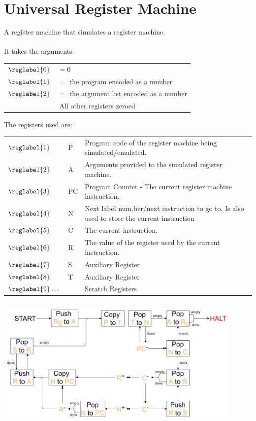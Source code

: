 \section{Universal Register Machine}
A register machine that simulates a register machine.
\\
\\ It takes the arguments:
\begin{center}
	\begin{tabular}{l p{}}
		$\reglabel{0}$ & $= 0$                                      \\
		$\reglabel{1}$ & $= $ the program encoded as a number       \\
		$\reglabel{2}$ & $= $ the argument list encoded as a number \\
		\multicolumn{2}{c}{All other registers zeroed}              \\
	\end{tabular}
\end{center}
The registers used are:
\begin{center}
	\begin{tabular}{l l p{}}
		$\reglabel{1}$      & P  & Program code of the register machine being simulated/emulated.                              \\
		$\reglabel{2}$      & A  & Arguments provided to the simulated register machine.                                       \\
		$\reglabel{3}$      & PC & Program Counter - The current register machine instruction.                                 \\
		$\reglabel{4}$      & N  & Next label num,ber/next instruction to go to. Is also used to store the current instruction \\
		$\reglabel{5}$      & C  & The current instruction.                                                                    \\
		$\reglabel{6}$      & R  & The value of the register used by the current instruction.                                  \\
		$\reglabel{7}$      & S  & Auxiliary Register                                                                          \\
		$\reglabel{8}$      & T  & Auxiliary Register                                                                          \\
		$\reglabel{9}\dots$ &    & Scratch Registers                                                                           \\
	\end{tabular}
\end{center}
\inputminted{python}{register_machines/code/universal_register_machine.py}
\begin{center}
	\includegraphics[width=0.9\textwidth]{register_machines/images/universal_register_machine.drawio.png}
\end{center}

